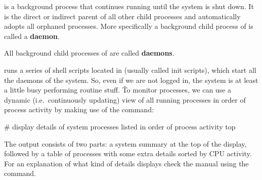  is a background process that continues running until the system is shut down. It is the direct or indirect
parent of all other child processes and automatically adopts all orphaned processes. More specifically a background
child process of  is called a \textbf{daemon}.

\bd[Daemon]
All background child processes of  are called \textbf{daemons}.
\ed

 runs a series of shell scripts located in  (usually called init scripts), which start all the
daemons of the system. So, even if we are not logged in, the system is at least a little busy performing routine stuff.
\v

To monitor processes, we can use a dynamic (i.e.\ continuously updating) view of all running processes in order of
process activity by making use of the  command:
\begin{bash}
# display details of system processes listed in order of process activity
top
\end{bash}

The  output consists of two parts: a system summary at the top of the display, followed by a table of
processes with some extra details sorted by CPU activity. For an explanation of what kind of details 
displays check the manual using the  command.